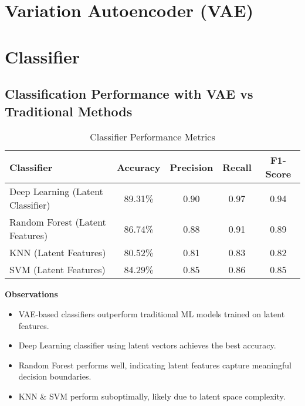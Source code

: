 \section{Variation Autoencoder (VAE)}



\section{Classifier}
\subsection{Classification Performance with VAE vs Traditional Methods}
\begin{table}[htbp]
    \centering
    \caption{Classifier Performance Metrics}
    \label{tab:performance_metrics}
    \begin{tabular}{>{\raggedright\arraybackslash}m{5cm}cccc}
        \hline
        \textbf{Classifier} & \textbf{Accuracy} & \textbf{Precision} & \textbf{Recall} & \textbf{F1-Score} \\
        \hline
        Deep Learning (Latent Classifier) & 89.31\% & 0.90 & 0.97 & 0.94 \\
        Random Forest (Latent Features) & 86.74\% & 0.88 & 0.91 & 0.89 \\
        KNN (Latent Features) & 80.52\% & 0.81 & 0.83 & 0.82 \\
        SVM (Latent Features) & 84.29\% & 0.85 & 0.86 & 0.85 \\
        \hline
    \end{tabular}
\end{table}

\textbf{Observations}

\begin{itemize}
    \item VAE-based classifiers outperform traditional ML models trained on latent features.
    \item Deep Learning classifier using latent vectors achieves the best accuracy.
    \item Random Forest performs well, indicating latent features capture meaningful decision boundaries.
    \item KNN \& SVM perform suboptimally, likely due to latent space complexity.
\end{itemize}




